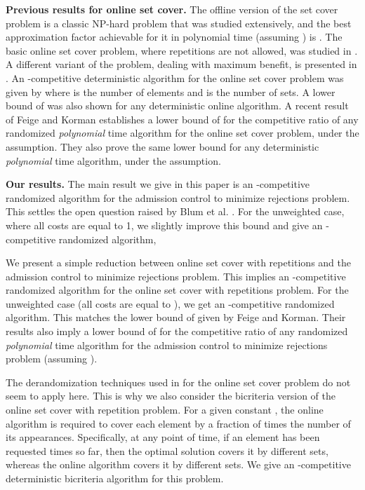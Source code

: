 \documentclass{sig-alternate}
\begin{document}
\textbf{Previous results for online set cover.} The offline
version of the set cover problem is a classic NP-hard problem that
was studied extensively, and the best approximation factor
achievable for it in polynomial time (assuming ) is
 \cite{C79,F98}. The basic online set cover
problem, where repetitions are not allowed, was studied in
\cite{AAABN03,FK05}. A different variant of the problem, dealing
with maximum benefit, is presented in \cite{AAFL96}. An -competitive deterministic algorithm for the online set
cover problem was given by \cite{AAABN03} where  is the number
of elements and  is the number of sets. A lower bound of
 was also
shown for any deterministic online algorithm. A recent result of
Feige and Korman \cite{FK05} establishes a lower bound of
 for the competitive ratio of any
randomized {\em polynomial} time algorithm for the online set
cover problem, under the  assumption. They also prove
the same lower bound for any deterministic {\em polynomial} time
algorithm, under the  assumption.

\textbf{Our results.} The main result we give in this paper is an
-competitive randomized algorithm for the
admission control to minimize rejections problem. This settles the
open question raised by Blum et al. \cite{BlKaKl01}. For the
unweighted case, where all costs are equal to 1, we slightly
improve this bound and give an -competitive
randomized algorithm,

We present a simple reduction between online set cover with
repetitions and the admission control to minimize rejections
problem. This implies an -competitive randomized
algorithm for the online set cover with repetitions problem. For
the unweighted case (all costs are equal to ), we get an
-competitive randomized algorithm. This matches
the lower bound of  given by Feige and
Korman. Their results also imply a lower bound of  for the competitive ratio of any randomized {\em
polynomial} time algorithm for the admission control to minimize
rejections problem (assuming ).

The derandomization techniques used in \cite{AAABN03} for the
online set cover problem do not seem to apply here. This is why we
also consider the bicriteria version of the online set cover with
repetition problem. For a given constant , the
online algorithm is required to cover each element by a fraction
of  times the number of its appearances. Specifically,
at any point of time, if an element has been requested  times
so far, then the optimal solution covers it by  different sets,
whereas the online algorithm covers it by 
different sets. We give an -competitive
deterministic bicriteria algorithm for this problem.
\end{document}
